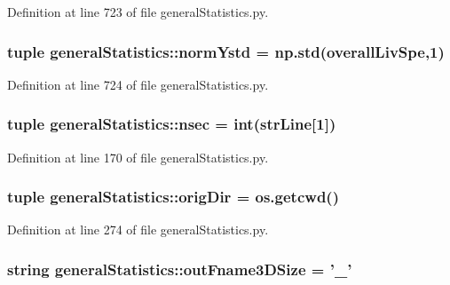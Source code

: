 \-Definition at line 723 of file general\-Statistics.\-py.

\hypertarget{namespacegeneral_statistics_ab775e3e84f49c48bb285c0713d55a6cd}{
\subsubsection[{norm\-Ystd}]{\setlength{\rightskip}{0pt plus 5cm}tuple {\bf general\-Statistics\-::norm\-Ystd} = np.\-std({\bf overall\-Liv\-Spe},1)}}\label{namespacegeneral_statistics_ab775e3e84f49c48bb285c0713d55a6cd}


\-Definition at line 724 of file general\-Statistics.\-py.

\hypertarget{namespacegeneral_statistics_a87e08b22001c9743c83dc51acc3ca722}{
\subsubsection[{nsec}]{\setlength{\rightskip}{0pt plus 5cm}tuple {\bf general\-Statistics\-::nsec} = int({\bf str\-Line}\mbox{[}1\mbox{]})}}\label{namespacegeneral_statistics_a87e08b22001c9743c83dc51acc3ca722}


\-Definition at line 170 of file general\-Statistics.\-py.

\hypertarget{namespacegeneral_statistics_ae6314a6ebdb4acc22a09fa68ca70565d}{
\subsubsection[{orig\-Dir}]{\setlength{\rightskip}{0pt plus 5cm}tuple {\bf general\-Statistics\-::orig\-Dir} = os.\-getcwd()}}\label{namespacegeneral_statistics_ae6314a6ebdb4acc22a09fa68ca70565d}


\-Definition at line 274 of file general\-Statistics.\-py.

\hypertarget{namespacegeneral_statistics_af956e5e24f6fb8519c5142bd589caeca}{
\subsubsection[{out\-Fname3\-D\-Size}]{\setlength{\rightskip}{0pt plus 5cm}string {\bf general\-Statistics\-::out\-Fname3\-D\-Size} = '{\bf \-\_\-}'}}\label{namespacegeneral_statistics_af956e5e24f6fb8519c5142bd589caeca}


